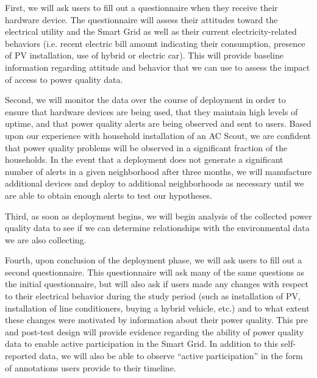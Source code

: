 First, we will ask users to fill out a questionnaire when they receive their hardware device.  The questionnaire will assess their attitudes toward the electrical utility and the Smart Grid as well as their current electricity-related behaviors (i.e. recent electric bill amount indicating their consumption, presence of PV installation, use of hybrid or electric car). This will provide baseline information regarding attitude and behavior that we can use to assess the impact of access to power quality data.

Second, we will monitor the data over the course of deployment in order to ensure that hardware devices are being used, that they maintain high levels of uptime, and that power quality alerts are being observed and sent to users.  Based upon our experience with household installation of an AC Scout, we are confident that power quality problems will be observed in a significant fraction of the households.  In the event that a deployment does not generate a significant number of alerts in a given neighborhood after three months, we will manufacture additional devices and deploy to additional neighborhoods as necessary until we are able to obtain enough alerts to test our hypotheses.

Third, as soon as deployment begins, we will begin analysis of the collected power quality data to see if we can determine relationships with the environmental data we are also collecting. 

Fourth, upon conclusion of the deployment phase, we will ask users to fill out a second questionnaire.  This questionnaire will ask many of the same questions as the initial questionnaire, but will also ask if users made any changes with respect to their electrical behavior during the study period (such as installation of PV, installation of line conditioners, buying a hybrid vehicle, etc.) and to what extent these changes were motivated by information about their power quality.  This pre and post-test design will provide evidence regarding the ability of power quality data to enable active participation in the Smart Grid.  In addition to this self-reported data, we will also be able to observe ``active participation'' in the form of annotations users provide to their timeline.

